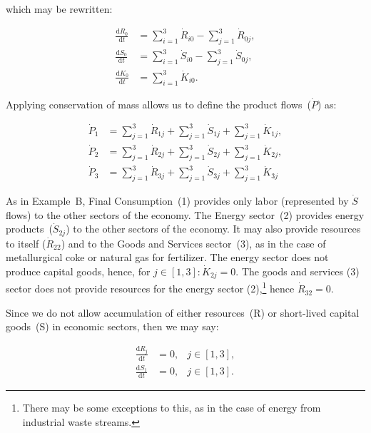 \noindent{}which may be rewritten:

\begin{align}
\label{eq:C_dR0a}
	\frac{\mathrm{d}R_{0}}{\mathrm{d}t}	&
	= \sum_{i = 1}^{3}\dot{R}_{i0}
	- \sum_{j = 1}^{3}\dot{R}_{0j},				\\
\label{eq:C_dS0a}
	\frac{\mathrm{d}S_{0}}{\mathrm{d}t}	&
	= \sum_{i = 1}^{3}\dot{S}_{i0}
	- \sum_{j = 1}^{3}\dot{S}_{0j},				\\
\label{eq:C_dK0a}
	\frac{\mathrm{d}K_{0}}{\mathrm{d}t}	&
	= \sum_{i = 1}^{3}\dot{K}_{i0}.
\end{align}

Applying conservation of mass
allows us to define the
product flows~($\dot{P}$) as:

\begin{align}
\label{eq:C_P1_def}
	\dot{P}_{1}										&
	= \sum_{j = 1}^{3}\dot{R}_{1j}
	+ \sum_{j = 1}^{3}\dot{S}_{1j}
	+ \sum_{j = 1}^{3}\dot{K}_{1j},	\\
\label{eq:C_P2_def}
	\dot{P}_{2}										&
	= \sum_{j = 1}^{3}\dot{R}_{2j}
	+ \sum_{j = 1}^{3}\dot{S}_{2j}
	+ \sum_{j = 1}^{3}\dot{K}_{2j},	\\
\label{eq:C_P3_def}							
	\dot{P}_{3}										&
	= \sum_{j = 1}^{3}\dot{R}_{3j}
	+ \sum_{j = 1}^{3}\dot{S}_{3j}
	+ \sum_{j = 1}^{3}\dot{K}_{3j}
\end{align}

As in Example~B, Final Consumption~(1) provides 
only labor (represented by $\dot{S}$ flows)
to the other sectors of the economy.
The Energy sector~(2) provides 
energy products~($\dot{S}_{2j}$) to the other
sectors of the economy. 
It may also provide resources to itself ($\dot{R}_{22}$)
and to the Goods and Services sector~(3), 
as in the case of metallurgical coke or 
natural gas for fertilizer.
The energy sector does not produce capital goods,
hence,
for $j \in [1,3]: \dot{K}_{2j} = 0$.
The goods and services (3) sector does not provide
resources for the energy sector (2),\footnote{There
may be some exceptions to this, as in the case of
energy from industrial waste streams.}
hence $\dot{R}_{32} = 0$.

Since we do not allow accumulation of either
resources~(R) or short-lived capital goods~(S) in
economic sectors,
then we may say:

\begin{align}\label{eq:C_dR_and_dS_zero}
	\frac{\mathrm{d}R_{j}}{\mathrm{d}t}			&
	= 0,																	&
	j \in [1,3],														\\
	\frac{\mathrm{d}S_{1}}{\mathrm{d}t} 		&
	= 0,																	&
	j \in [1,3].															
\end{align}

